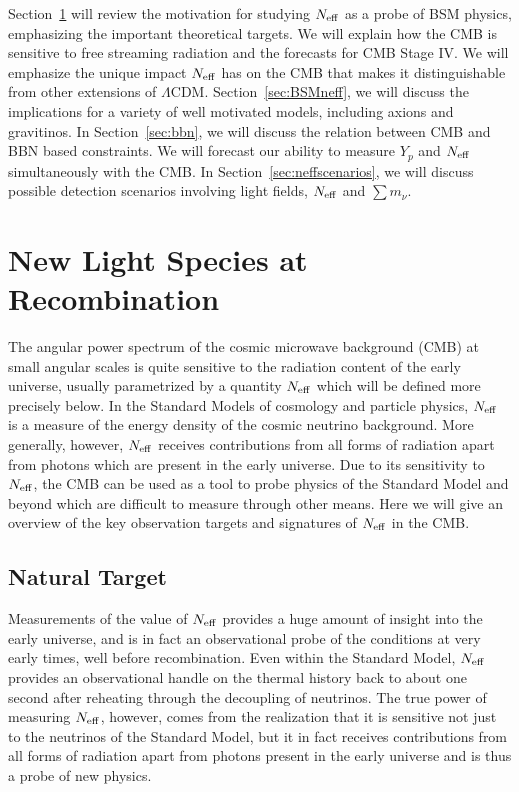 Section~\ref{sec:Neff} will review the motivation for studying $N_{\rm eff}$ as a probe of BSM physics, emphasizing the important theoretical targets.  We will explain how the CMB is sensitive to free streaming radiation and the forecasts for CMB Stage IV.  We will emphasize the unique impact $N_{\rm eff}$ has on the CMB that makes it distinguishable from other extensions of $\Lambda$CDM.   Section~\ref{sec:BSMneff}, we will discuss the implications for a variety of well motivated models, including axions and gravitinos.  In Section~\ref{sec:bbn}, we will discuss the relation between CMB and BBN based constraints.  We will forecast our ability to measure $Y_p$ and $N_{\rm eff}$ simultaneously with the CMB.  In Section~\ref{sec:neffscenarios}, we will discuss possible detection scenarios involving light fields, $N_{\rm eff}$ and $\sum m_\nu$.


\section{New Light Species at Recombination}\label{sec:Neff}


The angular power spectrum of the cosmic microwave background (CMB) at small angular scales is quite sensitive to the radiation content of the early universe, usually parametrized by a quantity $N_{\rm eff}$ which will be defined more precisely below.  In the Standard Models of cosmology and particle physics, $N_{\rm eff}$ is a measure of the energy density of the cosmic neutrino background.  More generally, however, $N_{\rm eff}$ receives contributions from all forms of radiation apart from photons which are present in the early universe.  Due to its sensitivity to $N_{\rm eff}$, the CMB can be used as a tool to probe physics of the Standard Model and beyond which are difficult to measure through other means.  Here we will give an overview of the key observation targets and signatures of $N_{\rm eff}$ in the CMB.  






\subsection{Natural Target}

Measurements of the value of $N_{\rm eff}$ provides a huge amount of insight into the early universe, and is in fact an observational probe of the conditions at very early times, well before recombination.  Even within the Standard Model, $N_{\rm eff}$ provides an observational handle on the thermal history back to about one second after reheating through the decoupling of neutrinos.  The true power of measuring $N_{\rm eff}$, however, comes from the realization that it is sensitive not just to the neutrinos of the Standard Model, but it in fact receives contributions from all forms of radiation apart from photons present in the early universe and is thus a probe of new physics.

